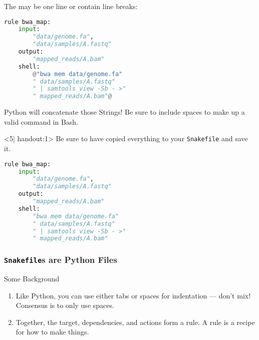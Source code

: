 \begin{frame}[fragile]
\begin{onlyenv}
   The  may be one line or contain line breaks:
  \begin{lstlisting}[language=Python,style=Python]
rule bwa_map:
    input:
        "data/genome.fa",
        "data/samples/A.fastq"
    output:
        "mapped_reads/A.bam"
    shell:
        @"bwa mem data/genome.fa"
        " data/samples/A.fastq"
        " | samtools view -Sb - >"
        " mapped_reads/A.bam"@
    \end{lstlisting}
    \bcattention Python will concatenate those Strings! Be sure to include spaces to make up a valid command in Bash.
  \end{onlyenv}
  \begin{onlyenv}<5| handout:1>
   Be sure to have copied everything to your \texttt{Snakefile} and save it.
   \begin{lstlisting}[language=Python,style=Python]
rule bwa_map:
    input:
        "data/genome.fa",
        "data/samples/A.fastq"
    output:
        "mapped_reads/A.bam"
    shell:
        "bwa mem data/genome.fa"
        " data/samples/A.fastq"
        " | samtools view -Sb - >"
        " mapped_reads/A.bam"
    \end{lstlisting}
  \end{onlyenv}
\end{frame}

\begin{frame}
  \frametitle{\texttt{Snakefile}s are Python Files}
  \begin{block}{Some Background}
     \begin{enumerate}
       \item Like Python, you can use either tabs or spaces for indentation — don’t mix! Consensus is to only use spaces.
       \item Together, the target, dependencies, and actions form a rule. A rule is a recipe for how to make things.
  \end{enumerate}
  \end{block}
\end{frame}

